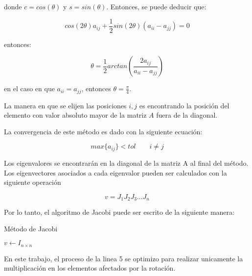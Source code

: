 donde $c=cos(\theta)$ y $s=sin(\theta)$. Entonces, se puede deducir que:

\begin{equation*}
    cos(2\theta)a_{ij}+\frac{1}{2}sin(2\theta)(a_{ii}-a_{jj})=0
\end{equation*}

entonces:

\begin{equation*}
    \theta = \frac{1}{2}arctan\left(\frac{2a_{ij}}{a_{ii}-a_{jj}}\right)
\end{equation*}

en el caso en que $a_{ii}=a_{jj}$, entonces $\theta=\frac{\pi}{4}$.

La manera en que se elijen las posiciones $i,j$ es encontrando la posición del elemento con valor absoluto mayor de la matriz $A$ fuera de la diagonal.

La convergencia de este método es dado con la siguiente ecuación:

\begin{equation*}
    max\{a_{ij}\} < tol \qquad i\neq j
\end{equation*}

Los eigenvalores se encontrarán en la diagonal de la matriz A al final del método. Los eigenvectores asociados a cada eigenvalor pueden ser calculados con la siguiente operación

\begin{equation*}
    v = J_1J_2J_3\dots J_n
\end{equation*}

Por lo tanto, el algoritmo de Jacobi puede ser escrito de la siguiente manera:

\begin{algorithm}[H]
    \caption{Método de Jacobi}
    \label{alg:jacobi_method}
    $v \gets I_{n\times n}$\\
\end{algorithm}

En este trabajo, el proceso de la linea 5 se optimizo para realizar unicamente la multiplicación en los elementos afectados por la rotación.